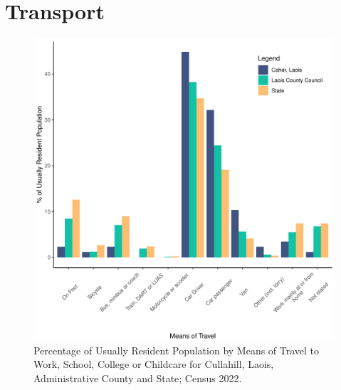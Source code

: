 \documentclass{article}
\begin{document}
\section{Transport}\label{sect:Trans}
\begin{figure}[H]
	\centering
	\includegraphics[width = 120mm]{../figures/TravelED.pdf}
	\caption{Percentage of Usually Resident Population by Means of Travel to Work, School, College or Childcare for Cullahill, Laois, Administrative County and State; Census 2022.}
	\label{fig:vbnv}
	\end{figure}
\end{document}
